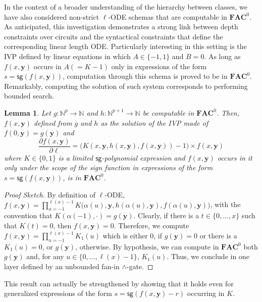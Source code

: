 \documentclass[11pt, oneside]{article}
\newcommand{\fun}[1]{\mathsf{#1}}
\newcommand{\Nat}{\mathbb{N}}
\newcommand{\AC}{\mathbf{FAC}}
\newcommand{\tu}[1]{\mathbf{#1}}
\newtheorem{lemma}{Lemma}
\theoremstyle{definition}
\begin{document}
In the context of a broader understanding of the hierarchy between classes, we have also considered non-strict $\ell$-ODE schemas that are computable in $\AC^0$. 
%
As anticipated, this investigation demonstrates a strong link between depth constraints over circuits and the syntactical constraints that define the corresponding linear length ODE.
%
Particularly interesting in this setting is the IVP defined by linear equations in which $A\in \{-1,1\}$ and $B=0$. 
%
As long as $f(x, \tu y)$ occurs in $A(=K-1)$ only in expressions of the form $s=\fun{sg}(f(x, \tu y))$, computation through this schema is proved to be in $\AC^0$.
%
Remarkably, computing the solution of such system corresponds to performing bounded search.




\begin{lemma}\label{lemma:ACODE}
    Let $g:\Nat^p\to \Nat$ and $h:\Nat^{p+1} \to \Nat$ be computable in $\AC^0$.
    Then, $f(x, \tu y)$ defined from $g$ and $h$ as the solution of the IVP made of $f(0, \tu y)=g(\tu y)$ and 
    $$
        \frac{\partial f(x, \tu y)}{\partial \ell} = \big(K(x, \tu y, h(x, \tu y), f(x, \tu y))-1\big) \times f(x, \tu y)
    $$
    where $K\in \{0,1\}$ is a limited $\fun{sg}$-polynomial expression and $f(x, \tu y)$ occurs in it only under the scope of the sign function in expressions of the form $s=\fun{sg}(f(x, \tu y))$, is in $\AC^0$.
\end{lemma}
\begin{proof}[Proof Sketch]
    By definition of $\ell$-ODE, $f(x, \tu y)=\prod^{\ell(x)-1}_{u=-1}K\big(\alpha(u), \tu y, h(\alpha(u), \tu y), f(\alpha(u), \tu y)\big)$, with the convention that $K(\alpha(-1), \cdot)=g(\tu y)$.
    Clearly, if there is a $t\in \{0,\dots,x\}$ such that $K(t)=0$, then $f(x, \tu y)=0$. 
    Therefore, we compute $f(x, \tu y)=\prod^{\ell(x)-1}_{u=-1}K_1(u)$ which is either 0, if $g(\tu y)=0$ or there is a $K_1(u)=0$, or $g(\tu y)$, otherwise.
    By hypothesis, we can compute in $\AC^0$ both $g(\tu y)$ and, for any $u\in \{0,\dots, \ell(x)-1\}$, $K_1(u)$. Thus, we conclude in one layer defined by an unbounded fan-in $\wedge$-gate.
\end{proof}
\noindent
This result can actually be strengthened by showing that it holds even for generalized expressions of the form $s = \fun{sg}(f(x, \tu y) - r)$ occurring in $K$.
\end{document}
